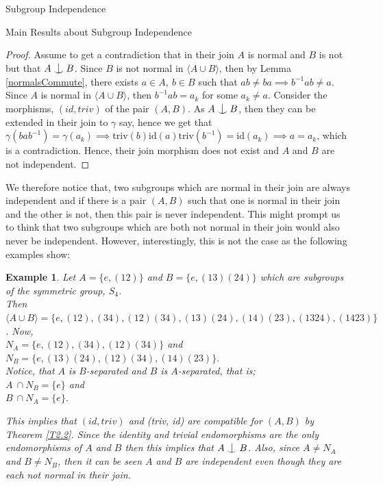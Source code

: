\documentclass{article}
\newtheorem{example}{Example}[section]
\def\indep{\mathrel{\raise0.2ex\hbox{\ooalign{\hidewidth$\vert$\hidewidth\cr\raise-0.9ex\hbox{$\smile$}}}}}
\begin{document}
\begin{section}{Subgroup Independence}
\begin{subsection}{Main Results about Subgroup Independence}
			\begin{proof}
				
				Assume to get a contradiction that in their join $A$ is normal and $B$ is not but that $A \indep B$. Since $B$ is not normal in $\langle A \cup B\rangle $, then by Lemma \ref{normalsCommute}, there exists $a \in A, \ b \in B$ such that $ab \not= ba \implies b^{-1}ab \not= a$. Since $A$ is normal in $\langle A \cup B\rangle $, then $b^{-1}ab = a_k$ for some $a_k \not= a$. Consider the morphisms, $(id, triv)$ of the pair $(A, B)$.  As $A \indep B$, then they can be extended in their join to $\gamma$ say, hence we get that $\gamma(bab^{-1}) = \gamma(a_k) \implies \text{triv}(b)\text{id}(a)\text{triv}(b^{-1}) = \text{id}(a_k) \implies a = a_k$, which is a contradiction. Hence, their join morphism does not exist and $A$ and $B$ are not independent. 
			\end{proof}
			
			
			\noindent We therefore notice that, two subgroups which are normal in their join are always independent and if there is a pair $(A, B)$ such that one is normal in their join and the other is not, then this pair is never independent. This might prompt us to think that two subgroups which are both not normal in their join  would also never be independent. However, interestingly, this is not the case as the following examples show:
			
			
			
			
			\begin{example}\label{mainEg}
				\normalfont
				Let $A =  \{ e, (1 2)  \}$ and $B  = \{ e, (1 3) (2 4)\}$ which are subgroups of the symmetric group, $S_4$.\\ 
				Then $\langle A \cup B\rangle  = \{ e, (1 2), (3 4) , (1 2)(3 4), (1 3)(2 4), (1 4)(2 3), (1324), (1423)\}$.  Now,\\
				$N_A  = \{e, (12), (34), (12)(34)\}$ and\\
				$N_B  = \{ e, (1 3)(24), (12)(34), (14)(23)\}.$\\ Notice, that $A$ is $B$-separated and $B$ is $A$-separated, that is;\\
				$A \  \cap  N_B  = \{e\}$ and \\
				$B \  \cap N_A  = \{e\}.$
				
				\noindent This implies that $(id, triv)$ and (triv, id) are compatible for $(A, B)$ by Theorem \ref {T2.2}. Since the identity and trivial endomorphisms are the only endomorphisms of $A$ and $B$  then this implies that  $A \indep B$. Also, since $A \not= N_A $ and $B \not =  N_B $, then it can  be seen $A$ and $B$ are independent even though they are each not normal in their join.
				

\end{example}
\end{subsection}
\end{section}
\end{document}
